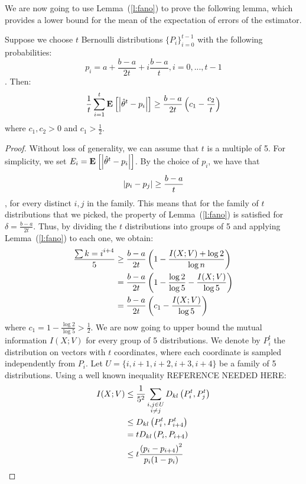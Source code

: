We are now going to use Lemma~(\ref{l:fano}) to prove the following lemma,
which provides a lower bound for the mean of the expectation of errors
of the estimator.
\begin{lemma}\label{l:fano_application}
  Suppose we choose $t$ Bernoulli distributions $\{P_i\}_{i=0}^{t-1}$
  with the following probabilities:
  \[
    p_i = a+\frac{b-a}{2t} + i \frac{b-a}{t} , i=0, ..., t-1
  \].
  Then:
  $$
  \frac{1}{t} \sum_{i=1}^t \Exp{\lp|\hat{\theta}^t-p_i\rp|}
  \geq \frac{b-a}{2t} \lp(c_1 - \frac{c_2}{t}\rp)
  $$
  where $c_1, c_2 >0$ and $c_1 > \frac{1}{2}$.
\end{lemma}
\begin{proof}
  Without loss of generality, we can assume that $t$ is a multiple of 5.
  For simplicity, we set $E_i = \Exp{\lp|\hat{\theta}^t-p_i\rp|}$.
  By the choice of $p_i$, we have that $$\left|p_i - p_j\right| \geq \frac{b-a}{t}$$,
  for every distinct $i,j$ in the family.
  This means that for the family of $t$ distributions that we picked, the property
  of Lemma~(\ref{l:fano}) is satisfied for $\delta = \frac{b-a}{2t}$.
  Thus, by dividing the $t$ distributions into groups of 5 and applying
  Lemma~(\ref{l:fano}) to each one, we obtain:
  \begin{align}\label{eq:fano}
    \frac{\sum{k =i}^{i+4}}{5}
    &\geq
    \frac{b-a}{2t}\left(1-\frac{I(X;V)+\log 2}{\log n}\right) \nonumber\\
    &=
    \frac{b-a}{2t}\left(1- \frac{\log 2}{\log 5} - \frac{I(X;V)}{\log5}\right) \nonumber\\
    &=
    \frac{b-a}{2t}\left(c_1 - \frac{I(X;V)}{\log5}\right)
  \end{align}
  where $c_1 = 1-\frac{\log2}{\log5} > \frac{1}{2}$.
  We are now going to upper bound the mutual information $I(X;V)$ for every
  group of 5 distributions. We denote by $P_i^t$ the distribution on
  vectors with $t$ coordinates,
  where each coordinate is sampled independently from $P_i$.
  Let $U= \{i,i+1,i+2,i+3,i+4\}$ be a family of 5 distributions.
  Using a well known inequality REFERENCE NEEDED HERE:
  \begin{align*}
    I(X;V)
    &\leq
    \frac{1}{5^2}\sum_{\substack{i,j \in U \\i\neq j}} D_{kl}\lp(P_i^t,P_j^t\rp)\\
    &\leq
    D_{kl}\lp(P_i^t, P_{i+4}^t\rp)\\
    &=
    t D_{kl}\lp(P_i, P_{i+4}\rp)\\
    &\leq
    t \frac{\lp(p_i - p_{i+4}\rp)^2}{p_i(1-p_i)}\\

\end{align*}
\end{proof}

